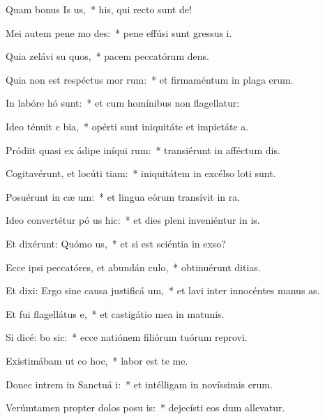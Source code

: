 \item Quam bonus Is us,~* his, qui recto sunt de!
\item Mei autem pene mo  des:~* pene effúsi sunt gressus i.
\item Quia zelávi su quos,~* pacem peccatórum dens.
\item Quia non est respéctus mor rum:~* et firmaméntum in plaga erum.
\item In labóre hó  sunt:~* et cum homínibus non flagellatur:
\item Ideo ténuit e bia,~* opérti sunt iniquitáte et impietáte a.
\item Pródiit quasi ex ádipe iníqui rum:~* transiérunt in afféctum dis.
\item Cogitavérunt, et locúti  tiam:~* iniquitátem in excélso loti sunt.
\item Posuérunt in cæ  um:~* et lingua eórum transívit in ra.
\item Ideo convertétur pó us hic:~* et dies pleni inveniéntur in is.
\item Et dixérunt: Quómo  us,~* et si est sciéntia in exso?
\item Ecce ipsi peccatóres, et abundán  culo,~* obtinuérunt ditias.
\item Et dixi: Ergo sine causa justificá  um,~* et lavi inter innocéntes manus as.
\item Et fui flagellátus  e,~* et castigátio mea in matunis.
\item Si dicé: bo sic:~* ecce natiónem filiórum tuórum reprovi.
\item Existimábam ut co hoc,~* labor est te me.
\item Donec intrem in Sanctuá i:~* et intélligam in novíssimis erum.
\item Verúmtamen propter dolos posu is:~* dejecísti eos dum allevatur.
